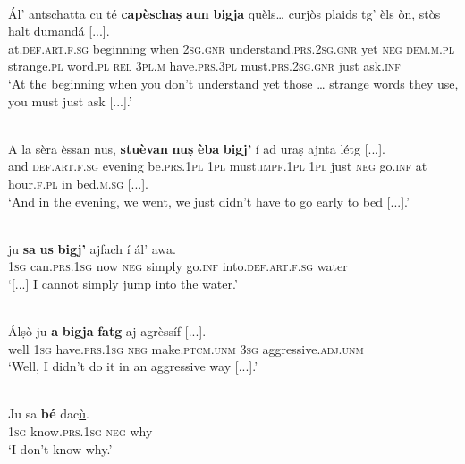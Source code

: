 \ea\label{}
\\
\gll    Ál’ antschatta cu té \textbf{capèschaṣ} \textbf{aun} \textbf{bigja} quèls… curjòs plaids tg’ èls òn, stòs halt dumandá [...].\\
at.\textsc{def.art.f.sg} beginning when \textsc{2sg.gnr} understand.\textsc{prs.2sg.gnr} yet \textsc{neg} \textsc{dem.m.pl} strange.\textsc{pl} word.\textsc{pl} \textsc{rel} \textsc{3pl.m} have.\textsc{prs.3pl} must.\textsc{prs.2sg.gnr} just ask.\textsc{inf}\\
\glt `At the beginning when you don’t understand yet those … strange words they use, you must just ask [...].'
\z

\ea\label{}
\\
\gll    A la sèra èssan nus, \textbf{stuèvan} \textbf{nuṣ} \textbf{èba} \textbf{bigj’} í ad uraṣ ajnta létg [...].\\
and \textsc{def.art.f.sg} evening be.\textsc{prs.1pl} \textsc{1pl} must.\textsc{impf.1pl} \textsc{1pl} just \textsc{neg} go.\textsc{inf} at hour.\textsc{f.pl} in  bed.\textsc{m.sg} [...].\\
\glt `And in the evening, we went, we just didn’t have to go early to bed [...].'
\z

\ea\label{}
\\
\gll  [...] ju \textbf{sa} \textbf{us} \textbf{bigj’} ajfach í ál’ awa.\\
{} \textsc{1sg} can.\textsc{prs.1sg} now \textsc{neg} simply go.\textsc{inf} into.\textsc{def.art.f.sg} water\\
\medskip
\glt `[...] I cannot simply jump into the water.'
\z

\ea
\label{}
\\
\gll  Álṣò ju \textbf{a} \textbf{bigja} \textbf{fatg} aj agrèssíf [...]. \\
well \textsc{1sg} have.\textsc{prs.1sg} \textsc{neg} make.\textsc{ptcm.unm} \textsc{3sg} aggressive.\textsc{adj.unm}\\
\glt `Well, I didn’t do it in an aggressive way [...].'
\z

\ea
\label{}
\\
\gll Ju sa \textbf{bé} dac\underline{ù}.   \\
\textsc{1sg} know.\textsc{prs.1sg} \textsc{neg} why \\
\glt `I don’t know why.'
\z

